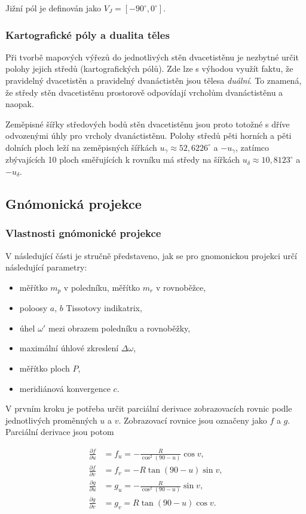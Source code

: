 \documentclass[12pt]{article}
\begin{document}
Jižní pól je definován jako $V_J = [-90^\circ, 0^\circ]$.

\subsubsection*{Kartografické póly a dualita těles}
Při tvorbě mapových výřezů do jednotlivých stěn dvacetistěnu je nezbytné určit polohy jejich středů (kartografických pólů). Zde lze s výhodou využít faktu, že pravidelný dvacetistěn a pravidelný dvanáctistěn jsou tělesa \textit{duální}. To znamená, že středy stěn dvacetistěnu prostorově odpovídají vrcholům dvanáctistěnu a naopak. 

Zeměpisné šířky středových bodů stěn dvacetistěnu jsou proto totožné s dříve odvozenými úhly pro vrcholy dvanáctistěnu. Polohy středů pěti horních a pěti dolních ploch leží na zeměpisných šířkách $u_\gamma \approx 52{,}6226^\circ$ a $-u_\gamma$, zatímco zbývajících 10 ploch směřujících k rovníku má středy na šířkách $u_\delta \approx 10{,}8123^\circ$ a $-u_\delta$.

{\subsection {Gnómonická projekce}}
{\subsubsection {Vlastnosti gnómonické projekce}}
V následující části je stručně představeno, jak se pro gnomonickou projekci určí následující parametry:

\begin{itemize}
    \item měřítko $m_p$ v poledníku, měřítko $m_r$ v rovnoběžce,
    \item poloosy $a$, $b$ Tissotovy indikatrix,
    \item úhel $\omega'$ mezi obrazem poledníku a rovnoběžky,
    \item maximální úhlové zkreslení $\Delta\omega$,
    \item měřítko ploch $P$,
    \item meridiánová konvergence $c$.
\end{itemize}

V prvním kroku je potřeba určit parciální derivace zobrazovacích rovnic podle jednotlivých proměnných $u$ a $v$. Zobrazovací rovnice jsou označeny jako $f$ a $g$. Parciální derivace jsou potom

\begin{align*}
    \frac{\partial f}{\partial u} &= f_u = -\frac{R}{\cos^2(90 - u)} \cos v, \\
    \frac{\partial f}{\partial v} &= f_v = -R \tan(90 - u) \sin v, \\
    \frac{\partial g}{\partial u} &= g_u = -\frac{R}{\cos^2(90 - u)} \sin v, \\
    \frac{\partial g}{\partial v} &= g_v = R \tan(90 - u) \cos v.
\end{align*}
\end{document}
